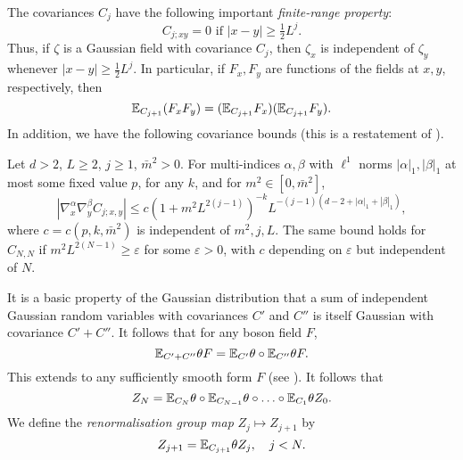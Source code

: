 The covariances $C_j$ have the following important \emph{finite-range property}:
\begin{equation}
C_{j;xy} = 0 \text{ if } |x - y| \ge \tfrac12 L^j.
\end{equation}
Thus, if $\zeta$ is a Gaussian field with covariance $C_j$, then $\zeta_x$ is independent
of $\zeta_y$ whenever $|x - y| \ge \tfrac12 L^j$. In particular,
if $F_x, F_y$ are functions of the fields at $x, y$, respectively, then
\begin{equation}
\label{e:uncorr}
\mathbb{E}_{C_{j+1}} (F_x F_y) = (\mathbb{E}_{C_{j+1}} F_x) (\mathbb{E}_{C_{j+1}} F_y).
\end{equation}
In addition, we have the following covariance bounds (this is a restatement of
\cite[Proposition~\ref{pt-prop:Cdecomp}(a)]{BBS-rg-pt}).

\begin{prop}
\label{prop:Cdecomp}
  Let $d >2$, $L\geq 2$, $j \ge 1$, $\bar m^2 >0$.
  For multi-indices $\alpha,\beta$ with
  $\ell^1$ norms $|\alpha|_1,|\beta|_1$ at most
  some fixed value $p$,
  for any $k$, and for $m^2 \in [0,\bar m^2]$,
  \begin{equation}
    \label{e:scaling-estimate}
    |\nabla_x^\alpha \nabla_y^\beta C_{j;x,y}|
    \leq c(1+m^2L^{2(j-1)})^{-k}
    L^{-(j-1)(d-2 +|\alpha|_1+|\beta|_1)},
  \end{equation}
  where $c=c(p,k,\bar m^2)$ is independent of $m^2,j,L$.
  The same bound holds for $C_{N,N}$ if
  $m^2L^{2(N-1)} \ge \varepsilon$ for some $\varepsilon >0$,
  with $c$ depending on $\varepsilon$ but independent of $N$.
\end{prop}


It is a basic property  of the Gaussian distribution that a sum of independent Gaussian random
variables with covariances
$C'$ and $C''$ is itself Gaussian with covariance $C' + C''$. It follows that for any
boson field $F$,
\begin{equation}
\mathbb{E}_{C'+C''}\theta F = \mathbb{E}_{C'}\theta \circ \mathbb{E}_{C''}\theta F.
\end{equation}
This extends to any sufficiently smooth form $F$ (see \cite{BS-rg-norm}).
It follows that
\begin{equation}
\label{e:prog-int}
Z_N =
\mathbb{E}_{C_N}\theta \circ \mathbb{E}_{C_{N-1}}\theta \circ \ldots \circ \mathbb{E}_{C_1}\theta Z_0.
\end{equation}
We define the \emph{renormalisation group map} $Z_j \mapsto Z_{j+1}$ by
\begin{equation}
\label{e:rgmapZ}
Z_{j+1} = \mathbb{E}_{C_{j+1}} \theta Z_j, \quad j < N.
\end{equation}

